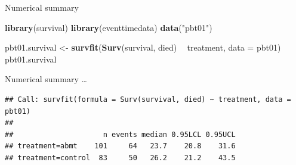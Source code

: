 \documentclass[ignorenonframetext,]{beamer}
\newenvironment{Shaded}{\begin{snugshade}}{\end{snugshade}}
\newcommand{\DataTypeTok}[1]{\textcolor[rgb]{0.13,0.29,0.53}{#1}}
\newcommand{\KeywordTok}[1]{\textcolor[rgb]{0.13,0.29,0.53}{\textbf{#1}}}
\newcommand{\NormalTok}[1]{#1}
\newcommand{\OperatorTok}[1]{\textcolor[rgb]{0.81,0.36,0.00}{\textbf{#1}}}
\newcommand{\StringTok}[1]{\textcolor[rgb]{0.31,0.60,0.02}{#1}}
\begin{document}
\begin{frame}[fragile]{%
\protect\hypertarget{numerical-summary}{%
Numerical summary}}

\scriptsize

\begin{Shaded}
\begin{Highlighting}[]
\KeywordTok{library}\NormalTok{(survival)}
\KeywordTok{library}\NormalTok{(eventtimedata)}
\KeywordTok{data}\NormalTok{(}\StringTok{"pbt01"}\NormalTok{)}

\NormalTok{pbt01.survival <-}\StringTok{ }\KeywordTok{survfit}\NormalTok{(}\KeywordTok{Surv}\NormalTok{(survival, died) }\OperatorTok{~}\StringTok{ }\NormalTok{treatment, }
                              \DataTypeTok{data =}\NormalTok{ pbt01)}
\NormalTok{pbt01.survival}
\end{Highlighting}
\end{Shaded}

\end{frame}

\begin{frame}[fragile]{%
\protect\hypertarget{numerical-summary-1}{%
Numerical summary \ldots}}

\scriptsize

\begin{verbatim}
## Call: survfit(formula = Surv(survival, died) ~ treatment, data = pbt01)
## 
##                     n events median 0.95LCL 0.95UCL
## treatment=abmt    101     64   23.7    20.8    31.6
## treatment=control  83     50   26.2    21.2    43.5
\end{verbatim}

\end{frame}
\end{document}
